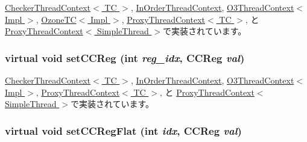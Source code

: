 \hyperlink{classCheckerThreadContext_a3dd3443357312bcb75580eaa508c48a4}{CheckerThreadContext$<$ TC $>$}, \hyperlink{classInOrderThreadContext_a3dd3443357312bcb75580eaa508c48a4}{InOrderThreadContext}, \hyperlink{classO3ThreadContext_a3dd3443357312bcb75580eaa508c48a4}{O3ThreadContext$<$ Impl $>$}, \hyperlink{classOzoneCPU_1_1OzoneTC_a3dd3443357312bcb75580eaa508c48a4}{OzoneTC$<$ Impl $>$}, \hyperlink{classProxyThreadContext_a3dd3443357312bcb75580eaa508c48a4}{ProxyThreadContext$<$ TC $>$}, と \hyperlink{classProxyThreadContext_a3dd3443357312bcb75580eaa508c48a4}{ProxyThreadContext$<$ SimpleThread $>$}で実装されています。\hypertarget{classThreadContext_a276736f0c1f99f27ed95348979e8b8c6}{
\subsubsection[{setCCReg}]{\setlength{\rightskip}{0pt plus 5cm}virtual void setCCReg (int {\em reg\_\-idx}, \/  {\bf CCReg} {\em val})}}
\label{classThreadContext_a276736f0c1f99f27ed95348979e8b8c6}


\hyperlink{classCheckerThreadContext_afd6c42b1888ad21a4382078ca7a86d09}{CheckerThreadContext$<$ TC $>$}, \hyperlink{classInOrderThreadContext_afd6c42b1888ad21a4382078ca7a86d09}{InOrderThreadContext}, \hyperlink{classO3ThreadContext_a6930132fc79b2f672ac4076133d103b3}{O3ThreadContext$<$ Impl $>$}, \hyperlink{classProxyThreadContext_afd6c42b1888ad21a4382078ca7a86d09}{ProxyThreadContext$<$ TC $>$}, と \hyperlink{classProxyThreadContext_afd6c42b1888ad21a4382078ca7a86d09}{ProxyThreadContext$<$ SimpleThread $>$}で実装されています。\hypertarget{classThreadContext_ab1028831649236bd6f229a4561663fd9}{
\subsubsection[{setCCRegFlat}]{\setlength{\rightskip}{0pt plus 5cm}virtual void setCCRegFlat (int {\em idx}, \/  {\bf CCReg} {\em val})}}
\label{classThreadContext_ab1028831649236bd6f229a4561663fd9}


